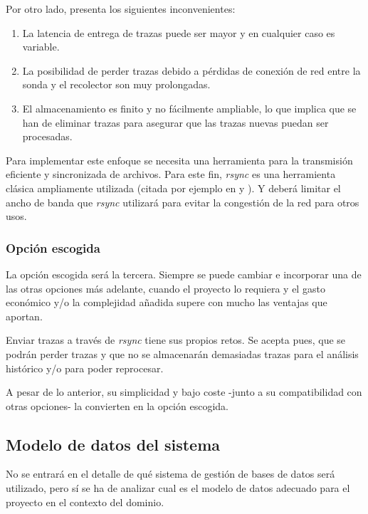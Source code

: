 Por otro lado, presenta los siguientes inconvenientes:

\begin{enumerate}
    \item La latencia de entrega de trazas puede ser mayor y en cualquier caso es variable.
    \item La posibilidad de perder trazas debido a pérdidas de conexión de red entre la sonda y el recolector son muy prolongadas.
    \item El almacenamiento es finito y no fácilmente ampliable, lo que implica que se han de eliminar trazas para asegurar que las trazas nuevas puedan
    ser procesadas.
\end{enumerate}

Para implementar este enfoque se necesita una herramienta para la transmisión eficiente y sincronizada de archivos. Para este fin,
\emph{rsync} es una herramienta clásica ampliamente utilizada (citada por ejemplo en \cite{Ph.D.200301} y \cite{douglis2004web}). Y deberá limitar el ancho de banda que \emph{rsync} utilizará para evitar la congestión de la red para otros usos.

\subsubsection{Opción escogida}

La opción escogida será la tercera. Siempre se puede cambiar e incorporar una de las otras opciones más adelante, cuando el proyecto lo requiera y el gasto económico
y/o la complejidad añadida supere con mucho las ventajas que aportan.

Enviar trazas a través de \emph{rsync} tiene sus propios retos. Se acepta pues, que se podrán perder trazas y que no se almacenarán
demasiadas trazas para el análisis histórico y/o para poder reprocesar.

A pesar de lo anterior, su simplicidad y bajo coste -junto a su compatibilidad con otras opciones- la convierten en la opción escogida.

\subsection{Modelo de datos del sistema}
\label{subsec:modelo-de-datos}

No se entrará en el detalle de qué sistema de gestión de bases de datos será utilizado, pero sí  se ha de analizar cual es el modelo de datos
adecuado para el proyecto en el contexto del dominio.

